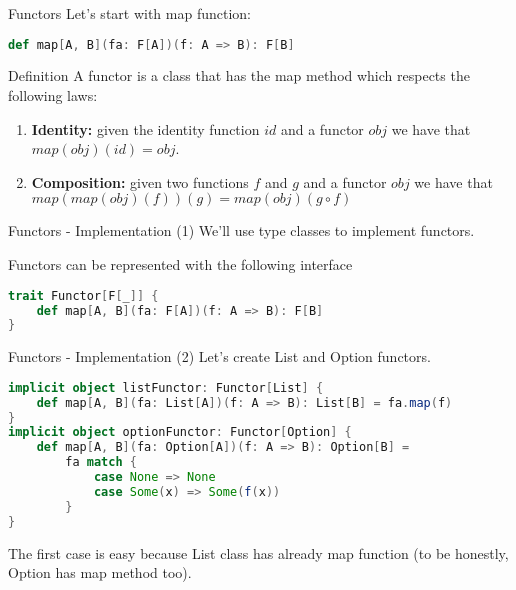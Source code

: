 \begin{frame}[fragile]{Functors}
	Let's start with map function:
\begin{lstlisting}[language=scala]
def map[A, B](fa: F[A])(f: A => B): F[B]
\end{lstlisting}
	\pause
	\begin{block}{Definition}
		A functor is a class that has the map method which respects the following laws:
		\begin{enumerate}[<+->]
			\item \textbf{Identity:} given the identity function $id$ and a functor $obj$ we have that $map(obj)(id) = obj$.
			\item \textbf{Composition:} given two functions $f$ and $g$ and a functor $obj$ we have that $map(map(obj)(f))(g) = map(obj)(g \circ f)$
		\end{enumerate}
	\end{block}	
\end{frame}

\begin{frame}[fragile]{Functors - Implementation (1)}	
	We'll use type classes to implement functors.
	
	Functors can be represented with the following interface
\begin{lstlisting}[language=scala]
trait Functor[F[_]] {
	def map[A, B](fa: F[A])(f: A => B): F[B]
}
\end{lstlisting}
\end{frame}

\begin{frame}[fragile]{Functors - Implementation (2)}			
	Let's create List and Option functors.
\begin{lstlisting}[language=scala]
implicit object listFunctor: Functor[List] {
	def map[A, B](fa: List[A])(f: A => B): List[B] = fa.map(f)
}
implicit object optionFunctor: Functor[Option] {
	def map[A, B](fa: Option[A])(f: A => B): Option[B] = 
		fa match {
			case None => None
			case Some(x) => Some(f(x))	
		}
}			
\end{lstlisting}		
	The first case is easy because List class has already map function
	(to be honestly, Option has map method too).
\end{frame}
	

